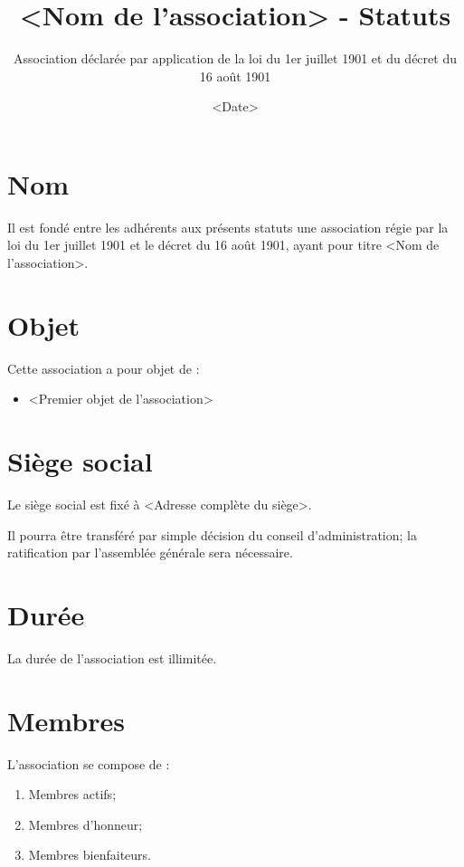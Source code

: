 \documentclass[12pt]{constitution}
\begin{document}
\title{<Nom de l'association> - Statuts}
\author{Association déclarée par application de la loi du 1er juillet 1901 et du décret du 16 août 1901}
\date{<Date>}
\maketitle
\newpage
	
\section{Nom}
Il est fondé entre les adhérents aux présents statuts une association régie par la loi du 1er juillet 1901 et le décret du 16 août 1901, ayant pour titre <Nom de l'association>.

\section{Objet}
Cette association a pour objet de :
\begin{itemize}
	\item <Premier objet de l'association>
\end{itemize}

\section{Siège social}
Le siège social est fixé à <Adresse complète du siège>.

Il pourra être transféré par simple décision du conseil d'administration; la ratification par l’assemblée générale sera nécessaire.

\section{Durée}
La durée de l’association est illimitée.

\setcounter{section}{4}

\section{Membres}
L'association se compose de :
\begin{enumerate}
	\item Membres actifs;
	\item Membres d'honneur;
	\item Membres bienfaiteurs.
\end{enumerate}
\end{document}
